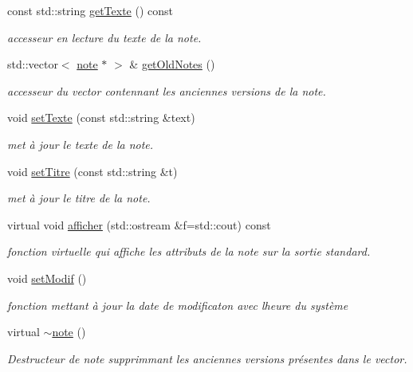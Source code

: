 \begin{DoxyCompactItemize}
\mbox{\label{classnote_a45af8038b60447374ba961a414910a49}} 
const std\+::string \hyperlink{classnote_a45af8038b60447374ba961a414910a49}{get\+Texte} () const
\begin{DoxyCompactList}\small\item\em accesseur en lecture du texte de la note. \end{DoxyCompactList}\item 
\mbox{\label{classnote_a8cfc267bcce6a99035df33e420a18f38}} 
std\+::vector$<$ \hyperlink{classnote}{note} $\ast$ $>$ \& \hyperlink{classnote_a8cfc267bcce6a99035df33e420a18f38}{get\+Old\+Notes} ()
\begin{DoxyCompactList}\small\item\em accesseur du vector contennant les anciennes versions de la note. \end{DoxyCompactList}\item 
void \hyperlink{classnote_a2895efc80041830db954a5af4b0670bf}{set\+Texte} (const std\+::string \&text)
\begin{DoxyCompactList}\small\item\em met à jour le texte de la note. \end{DoxyCompactList}\item 
void \hyperlink{classnote_a70884d3640a6f4440ddb9bd30925b5e7}{set\+Titre} (const std\+::string \&t)
\begin{DoxyCompactList}\small\item\em met à jour le titre de la note. \end{DoxyCompactList}\item 
\mbox{\label{classnote_a8fce1df255349a335517128f8e9af543}} 
virtual void \hyperlink{classnote_a8fce1df255349a335517128f8e9af543}{afficher} (std\+::ostream \&f=std\+::cout) const
\begin{DoxyCompactList}\small\item\em fonction virtuelle qui affiche les attributs de la note sur la sortie standard. \end{DoxyCompactList}\item 
\mbox{\label{classnote_ab90880ae93348a23d0f84f2c2931e0bf}} 
void \hyperlink{classnote_ab90880ae93348a23d0f84f2c2931e0bf}{set\+Modif} ()
\begin{DoxyCompactList}\small\item\em fonction mettant à jour la date de modificaton avec l\textquotesingle{}heure du système \end{DoxyCompactList}\item 
\mbox{\label{classnote_abaece2737aa27cf5efb19e75bedcc41f}} 
virtual \hyperlink{classnote_abaece2737aa27cf5efb19e75bedcc41f}{$\sim$note} ()
\begin{DoxyCompactList}\small\item\em Destructeur de note supprimmant les anciennes versions présentes dans le vector. \end{DoxyCompactList}\end{DoxyCompactItemize}
